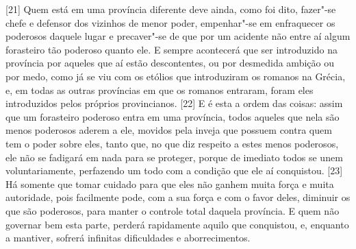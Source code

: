 {[}21{]} Quem está em uma província diferente deve ainda, como foi dito,
fazer"-se chefe e defensor dos vizinhos de menor poder, empenhar"-se em
enfraquecer os poderosos daquele lugar e precaver"-se de que por um
acidente não entre aí algum forasteiro tão poderoso quanto ele. E sempre
acontecerá que ser introduzido na província por aqueles que aí estão
descontentes, ou por desmedida ambição ou por medo, como já se viu com
os etólios que introduziram os romanos na Grécia, e, em todas as outras
províncias em que os romanos entraram, foram eles introduzidos pelos
próprios provincianos.
{[}22{]} E é esta a ordem das coisas: assim que um forasteiro poderoso
entra em uma província, todos aqueles que nela são menos poderosos
aderem a ele, movidos pela inveja que possuem contra quem tem o poder
sobre eles, tanto que, no que diz respeito a estes menos poderosos, ele
não se fadigará em nada para se proteger, porque de imediato todos se
unem voluntariamente, perfazendo um todo com a condição que ele aí
conquistou. {[}23{]} Há somente que tomar cuidado para que eles não
ganhem muita força e muita autoridade, pois facilmente pode, com a sua
força e com o favor deles, diminuir os que são poderosos, para manter o
controle total daquela província. E quem não governar bem esta parte,
perderá rapidamente aquilo que conquistou, e, enquanto a mantiver,
sofrerá infinitas dificuldades e aborrecimentos.

